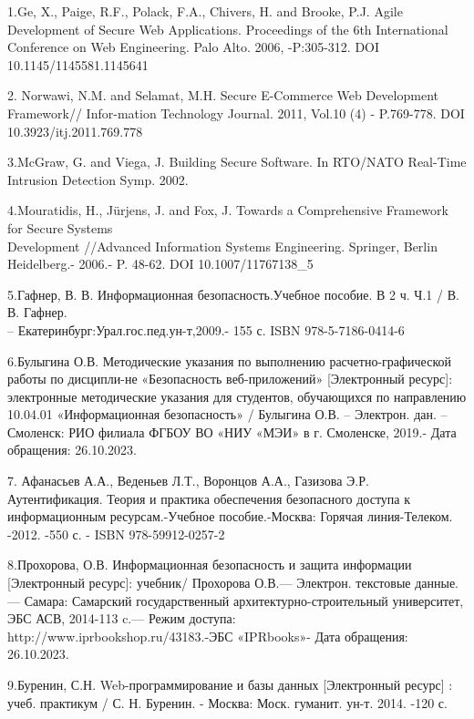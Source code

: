 \begin{noparindent}

1.Ge, X., Paige, R.F., Polack, F.A., Chivers, H. and Brooke, P.J. Agile
Development of Secure Web Applications. Proceedings of the 6th
International Conference on Web Engineering. Palo Alto. 2006,
-P:305-312. DOI 10.1145/1145581.1145641

2. Norwawi, N.M. and Selamat, M.H. Secure E-Commerce Web Development
Framework// Infor-mation Technology Journal. 2011, Vol.10 (4) -
P.769-778. DOI 10.3923/itj.2011.769.778

3.McGraw, G. and Viega, J. Building Secure Software. In RTO/NATO
Real-Time Intrusion Detection Symp. 2002.

4.Mouratidis, H., Jürjens, J. and Fox, J. Towards a Comprehensive
Framework for Secure Systems \\Development //Advanced Information Systems
Engineering. Springer, Berlin Heidelberg.- 2006.- P. 48-62. DOI
10.1007/11767138\_5

5.Гафнер, В. В. Информационная безопасность.Учебное пособие. В 2 ч. Ч.1
/ В. В. Гафнер.\\ -- Екатеринбург:Урал.гос.пед.ун-т,2009.- 155 с. ISBN
978-5-7186-0414-6

6.Булыгина О.В. Методические указания по выполнению расчетно-графической
работы по дисципли-не «Безопасность веб-приложений» {[}Электронный
ресурс{]}: электронные методические указания для студентов, обучающихся
по направлению 10.04.01 «Информационная безопасность» / Булыгина О.В. --
Электрон. дан. -- Смоленск: РИО филиала ФГБОУ ВО «НИУ «МЭИ» в г.
Смоленске, 2019.- Дата обращения: 26.10.2023.

7. Афанасьев А.А., Веденьев Л.Т., Воронцов А.А., Газизова Э.Р.
Аутентификация. Теория и практика обеспечения безопасного доступа к
информационным ресурсам.-Учебное пособие.-Москва: Горячая линия-Телеком.
-2012. -550 с. - ISBN 978-59912-0257-2

8.Прохорова, О.В. Информационная безопасность и защита информации
{[}Электронный ресурс{]}: учебник/ Прохорова О.В.--- Электрон. текстовые
данные.--- Самара: Самарский государственный архитектурно-строительный
университет, ЭБС АСВ, 2014-113 c.--- Режим доступа:
\\http://www.iprbookshop.ru/43183.-ЭБС «IPRbooks»- Дата обращения:
26.10.2023.

9.Буренин, С.Н. Web-программирование и базы данных {[}Электронный
ресурс{]} : учеб. практикум / С. Н. Буренин. - Москва: Моск. гуманит.
ун-т. 2014. -120 с.


\end{noparindent}
